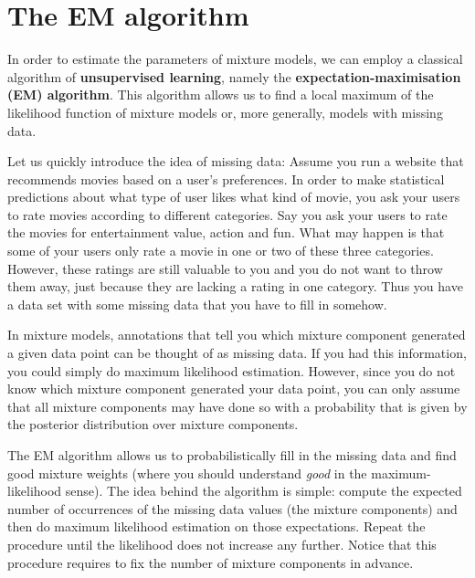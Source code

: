 \section{The EM algorithm}

In order to estimate the parameters of mixture models, we can employ a classical algorithm of 
\textbf{unsupervised learning}, namely the \textbf{expectation-maximisation (EM) algorithm}. This
algorithm allows us to find a local maximum of the likelihood function of mixture models or, more
generally, models with missing data. 

Let us quickly introduce the idea of missing data: Assume you run a website that recommends movies
based on a user's preferences. In order to make statistical predictions about what type of user
likes what kind of movie, you ask your users to rate movies according to different categories.
Say you ask your users to rate the movies for entertainment value, action and fun. What may happen is
that some of your users only rate a movie in one or two of these three categories. However, these
ratings are still valuable to you and you do not want to throw them away, just because they are lacking
a rating in one category. Thus you have a data set with some missing data that you have to fill in somehow.

\medskip 
In mixture models, annotations that tell you which mixture component
generated a given data point can be thought of as missing data. If you had this information, you could simply do maximum likelihood estimation.
However, since you do not know which mixture component generated your data point, you can only
assume that all mixture components may have done so with a probability that is given by the posterior distribution
over mixture components.

The EM algorithm allows us to probabilistically fill in the missing data and find good mixture weights
(where you should understand \textit{good} in the maximum-likelihood sense). The idea behind the
algorithm is simple: compute the expected number of occurrences of the missing data values (the mixture 
components) and then do maximum likelihood estimation on those expectations. Repeat the procedure 
until the likelihood does not increase any further. Notice that this procedure requires to
fix the number of mixture components in advance.

